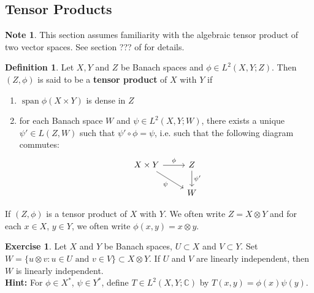 \documentclass[12pt]{amsart}
\theoremstyle{definition}
\newtheorem{defn}[definition]{Definition}
\newtheorem{note}[definition]{Note}
\newtheorem{ex}[definition]{Exercise}
\newcommand{\C}{\mathbb{C}}
\DeclareMathOperator{\spn}{span}
\begin{document}
	\newpage
	\subsection{Tensor Products}
	
	\begin{note}
	This section assumes familiarity with the algebraic tensor product of two vector spaces. See section ??? of \cite{algebra} for details. 
	\end{note}	
	
	\begin{defn}
	Let $X, Y$ and $Z$ be Banach spaces and $\phi \in L^2(X,Y ; Z) $. Then $(Z, \phi)$ is said to be a \textbf{tensor product} of $X$ with $Y$ if 
	\begin{enumerate}
	\item $\spn \phi(X \times Y)$ is dense in $Z$
	\item for each Banach space $W$ and $\psi \in L^2(X,Y;W)$, there exists a unique $\psi' \in L(Z, W)$ such that $\psi' \circ \phi = \psi$, i.e. such that the following diagram commutes: 
	\[ \begin{tikzcd}
	X \times Y \arrow[r, "\phi"] \arrow[dr, "\psi"'] 	
	& Z  \arrow[d, "\psi'"] \\
	& W 
\end{tikzcd}
	\]
	\end{enumerate}
	If $(Z, \phi)$ is a tensor product of $X$ with $Y$. We often write $Z = X \otimes Y$ and for each $x\in X$, $y \in Y$, we often write $\phi(x,y) = x \otimes y$.
	\end{defn}	
	
	\begin{ex}
	Let $X$ and $Y$ be Banach spaces, $U \subset X$ and $V \subset Y$. Set $W = \{u \otimes v: u \in U \text{ and } v \in V\} \subset X \otimes Y$. If $U$ and $V$ are linearly independent, then $W$ is linearly independent.\\
	\textbf{Hint:} For $\phi \in X^*$, $\psi \in Y^*$, define $T \in L^2(X, Y; \C)$ by $T(x,y) = \phi(x)\psi(y)$.
	\end{ex}	
	
\end{document}

